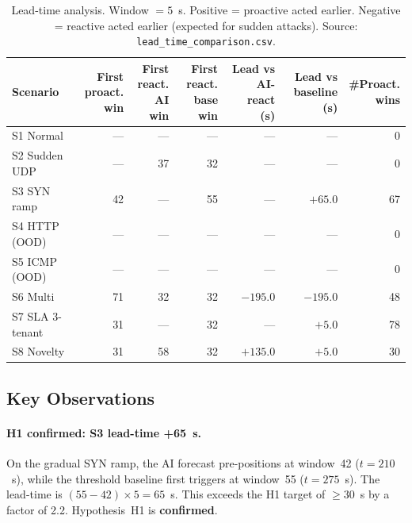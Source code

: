 \begin{table}[H]
\centering
\small
\caption{Lead-time analysis. Window $= 5$~s.
Positive = proactive acted earlier. Negative = reactive acted earlier
(expected for sudden attacks).
Source: \texttt{lead\_time\_comparison.csv}.}
\label{tab:lead-time}
\begin{tabular}{@{}lrrrrrr@{}}
\toprule
Scenario
  & \parbox{1.2cm}{\centering First\\proact.\\win}
  & \parbox{1.2cm}{\centering First\\react.\\AI win}
  & \parbox{1.3cm}{\centering First\\react.\\base win}
  & \parbox{1.5cm}{\centering Lead vs\\AI-react (s)}
  & \parbox{1.5cm}{\centering Lead vs\\baseline (s)}
  & \parbox{1.0cm}{\centering \#Proact.\\wins} \\
\midrule
S1 Normal       & ---& --- & --- & ---           & ---            &  0 \\
S2 Sudden UDP   & ---&  37 &  32 & ---           & ---            &  0 \\
S3 SYN ramp     &  42& --- &  55 & ---           & $+\mathbf{65.0}$ & 67 \\
S4 HTTP (OOD)   & ---& --- & --- & ---           & ---            &  0 \\
S5 ICMP (OOD)   & ---& --- & --- & ---           & ---            &  0 \\
S6 Multi        &  71&  32 &  32 & $-195.0$      & $-195.0$       & 48 \\
S7 SLA 3-tenant &  31& --- &  32 & ---           & $+\mathbf{5.0}$  & 78 \\
S8 Novelty      &  31&  58 &  32 & $+\mathbf{135.0}$ & $+\mathbf{5.0}$ & 30 \\
\bottomrule
\end{tabular}
\end{table}

\subsection{Key Observations}

\paragraph{H1 confirmed: S3 lead-time +65~s.}
On the gradual SYN ramp, the AI forecast pre-positions  at
window~42 ($t = 210$~s), while the threshold baseline first triggers
 at window~55 ($t = 275$~s). The lead-time is
$(55 - 42) \times 5 = 65$~s. This exceeds the H1 target of $\geq 30$~s
by a factor of 2.2. Hypothesis~H1 is \textbf{confirmed}.


